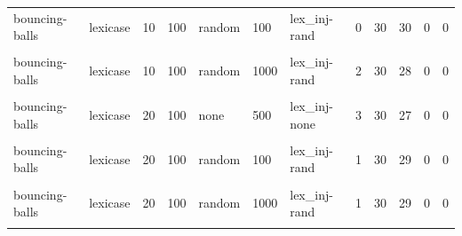 \documentclass[
]{book}
\begin{document}
\begin{table}
\begin{tabular}{l|l|l|l|l|l|l|r|r|r|r|r}
\hline
\cellcolor{gray!6}{bouncing-balls} & \cellcolor{gray!6}{lexicase} & \cellcolor{gray!6}{10} & \cellcolor{gray!6}{100} & \cellcolor{gray!6}{none} & \cellcolor{gray!6}{1000} & \cellcolor{gray!6}{lex\_inj-none} & \cellcolor{gray!6}{0} & \cellcolor{gray!6}{30} & \cellcolor{gray!6}{30} & \cellcolor{gray!6}{0} & \cellcolor{gray!6}{0}\\
\hline
bouncing-balls & lexicase & 10 & 100 & random & 100 & lex\_inj-rand & 0 & 30 & 30 & 0 & 0\\
\hline
\cellcolor{gray!6}{bouncing-balls} & \cellcolor{gray!6}{lexicase} & \cellcolor{gray!6}{10} & \cellcolor{gray!6}{100} & \cellcolor{gray!6}{random} & \cellcolor{gray!6}{500} & \cellcolor{gray!6}{lex\_inj-rand} & \cellcolor{gray!6}{1} & \cellcolor{gray!6}{30} & \cellcolor{gray!6}{29} & \cellcolor{gray!6}{0} & \cellcolor{gray!6}{0}\\
\hline
bouncing-balls & lexicase & 10 & 100 & random & 1000 & lex\_inj-rand & 2 & 30 & 28 & 0 & 0\\
\hline
\cellcolor{gray!6}{bouncing-balls} & \cellcolor{gray!6}{lexicase} & \cellcolor{gray!6}{20} & \cellcolor{gray!6}{100} & \cellcolor{gray!6}{none} & \cellcolor{gray!6}{100} & \cellcolor{gray!6}{lex\_inj-none} & \cellcolor{gray!6}{1} & \cellcolor{gray!6}{30} & \cellcolor{gray!6}{29} & \cellcolor{gray!6}{0} & \cellcolor{gray!6}{0}\\
\hline
bouncing-balls & lexicase & 20 & 100 & none & 500 & lex\_inj-none & 3 & 30 & 27 & 0 & 0\\
\hline
\cellcolor{gray!6}{bouncing-balls} & \cellcolor{gray!6}{lexicase} & \cellcolor{gray!6}{20} & \cellcolor{gray!6}{100} & \cellcolor{gray!6}{none} & \cellcolor{gray!6}{1000} & \cellcolor{gray!6}{lex\_inj-none} & \cellcolor{gray!6}{0} & \cellcolor{gray!6}{30} & \cellcolor{gray!6}{30} & \cellcolor{gray!6}{0} & \cellcolor{gray!6}{0}\\
\hline
bouncing-balls & lexicase & 20 & 100 & random & 100 & lex\_inj-rand & 1 & 30 & 29 & 0 & 0\\
\hline
\cellcolor{gray!6}{bouncing-balls} & \cellcolor{gray!6}{lexicase} & \cellcolor{gray!6}{20} & \cellcolor{gray!6}{100} & \cellcolor{gray!6}{random} & \cellcolor{gray!6}{500} & \cellcolor{gray!6}{lex\_inj-rand} & \cellcolor{gray!6}{0} & \cellcolor{gray!6}{30} & \cellcolor{gray!6}{30} & \cellcolor{gray!6}{0} & \cellcolor{gray!6}{0}\\
\hline
bouncing-balls & lexicase & 20 & 100 & random & 1000 & lex\_inj-rand & 1 & 30 & 29 & 0 & 0\\
\hline
\cellcolor{gray!6}{dice-game} & \cellcolor{gray!6}{age-lexicase} & \cellcolor{gray!6}{10} & \cellcolor{gray!6}{100} & \cellcolor{gray!6}{random} & \cellcolor{gray!6}{100} & \cellcolor{gray!6}{age-lex\_inj-rand} & \cellcolor{gray!6}{20} & \cellcolor{gray!6}{30} & \cellcolor{gray!6}{10} & \cellcolor{gray!6}{0} & \cellcolor{gray!6}{0}\\

\end{tabular}
\end{table}
\end{document}
